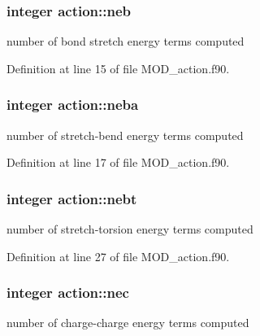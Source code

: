 \hypertarget{classaction_a2dba92353771ac9ebf606dc123bd88d1}{
\subsubsection[{neb}]{\setlength{\rightskip}{0pt plus 5cm}integer action\-::neb}}\label{classaction_a2dba92353771ac9ebf606dc123bd88d1}


number of bond stretch energy terms computed 



Definition at line 15 of file M\-O\-D\-\_\-action.\-f90.

\hypertarget{classaction_ac2ad49a38672c2696b5cfc769b6cb4dd}{
\subsubsection[{neba}]{\setlength{\rightskip}{0pt plus 5cm}integer action\-::neba}}\label{classaction_ac2ad49a38672c2696b5cfc769b6cb4dd}


number of stretch-\/bend energy terms computed 



Definition at line 17 of file M\-O\-D\-\_\-action.\-f90.

\hypertarget{classaction_a4fd1cbddf403ce7ee2d02f6038bd9332}{
\subsubsection[{nebt}]{\setlength{\rightskip}{0pt plus 5cm}integer action\-::nebt}}\label{classaction_a4fd1cbddf403ce7ee2d02f6038bd9332}


number of stretch-\/torsion energy terms computed 



Definition at line 27 of file M\-O\-D\-\_\-action.\-f90.

\hypertarget{classaction_ad4513f41298b1b1c80c08a7eb6549140}{
\subsubsection[{nec}]{\setlength{\rightskip}{0pt plus 5cm}integer action\-::nec}}\label{classaction_ad4513f41298b1b1c80c08a7eb6549140}


number of charge-\/charge energy terms computed 



